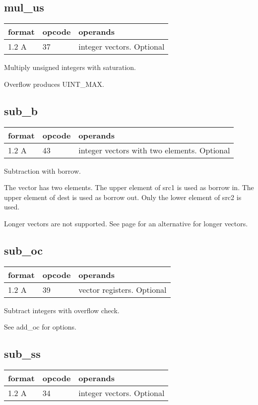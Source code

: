 \documentclass[forwardcom.tex]{subfiles}
\begin{document}
\subsection{mul\_us}
\label{table:mulUsInstruction}
\begin{tabular}{|p{12mm}|p{15mm}|p{100mm}|}
\hline
\bfseries format & \bfseries opcode & \bfseries operands \\ \hline
1.2 A & 37 & integer vectors. Optional \\ \hline
\end{tabular}
\vv

Multiply unsigned integers with saturation.

Overflow produces UINT\_MAX.
\vv

\subsection{sub\_b}
\label{table:subBInstruction}
\begin{tabular}{|p{12mm}|p{15mm}|p{100mm}|}
\hline
\bfseries format & \bfseries opcode & \bfseries operands \\ \hline
1.2 A & 43 & integer vectors with two elements. Optional \\ \hline
\end{tabular}
\vv

Subtraction with borrow.
\vv

The vector has two elements. The upper element of src1 is used as borrow in. The upper element of dest is used as borrow out. Only the lower element of src2 is used.
\vv

Longer vectors are not supported. See page 
\pageref{highPrecisionArithmetic} for an alternative for longer vectors.
\vv

\subsection{sub\_oc}
\label{table:subOcInstruction}
\begin{tabular}{|p{12mm}|p{15mm}|p{100mm}|}
\hline
\bfseries format & \bfseries opcode & \bfseries operands \\ \hline
1.2 A & 39 & vector registers. Optional \\ \hline
\end{tabular}
\vv

Subtract integers with overflow check.

See add\_oc for options.
\vv

\subsection{sub\_ss}
\label{table:subSsInstruction}
\begin{tabular}{|p{12mm}|p{15mm}|p{100mm}|}
\hline
\bfseries format & \bfseries opcode & \bfseries operands \\ \hline
1.2 A & 34 & integer vectors. Optional \\ \hline
\end{tabular}
\vv
\end{document}
